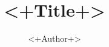 \documentclass[11pt]{article}
\title{<+Title+>}
\author{<+Author+>}
\date{ }  %
\begin{document}
\maketitle
\tableofcontents



%

\clearpage  %
\nocite{*}  %


\end{document}
